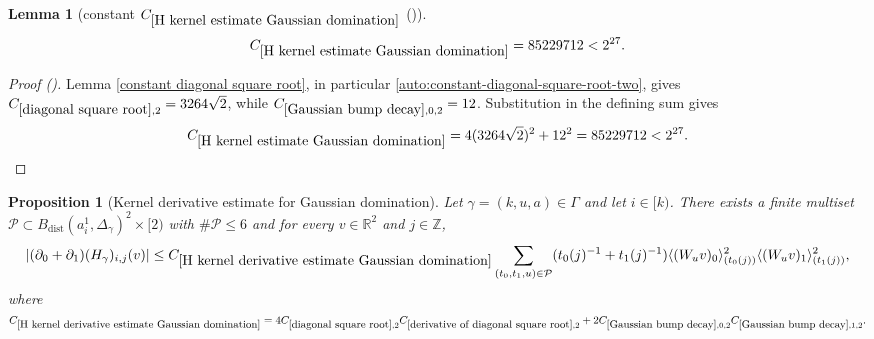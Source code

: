 \documentclass[12pt,reqno]{amsart}
\newcommand{\auto}{{({\tiny\faCar})}}
\theoremstyle{plain}
\newtheorem{lemma}[theorem]{Lemma}
\newtheorem{proposition}[theorem]{Proposition}
\numberwithin{equation}{section}
\theoremstyle{remark}
\newcommand{\uses}[1]{}
\newcommand{\usesdefs}[1]{}
\newcommand{\Z}{{\mathbb Z}}
\newcommand{\R}{{\mathbb R}}
\begin{document}
\begin{lemma}[constant $C_{\ref{H kernel estimate Gaussian domination}}$ \auto]\label{constant H kernel estimate Gaussian domination}\uses{constant diagonal square root,diagonal square root,Gaussian bump decay,H kernel estimate Gaussian domination}\usesdefs{}
\begin{equation}\label{constant H kernel estimate Gaussian domination bound}
C_{\ref{H kernel estimate Gaussian domination}}
=85229712<2^{27}.
\end{equation}
\end{lemma}
\begin{proof}[Proof \auto]
Lemma \ref{constant diagonal square root}, in particular \eqref{auto:constant-diagonal-square-root-two}, gives
$C_{\ref{diagonal square root},2}=3264\sqrt2$, while
$C_{\ref{Gaussian bump decay},0,2}=12$. Substitution in the defining sum gives
\[
C_{\ref{H kernel estimate Gaussian domination}}
=4(3264\sqrt2)^2+12^2
=85229712<2^{27}.
\]
\end{proof}


\begin{proposition}[Kernel derivative estimate for Gaussian domination]\label{H kernel derivative estimate Gaussian domination}\uses{H kernel estimate Gaussian domination,diagonal square root,derivative of diagonal square root,Gaussian bump decay}\usesdefs{bracket bump,closed balls in A,geometric parameters,auto:unitary-matrices-definition,2D Gaussians,auto:Gaussian-difference-kernel-definition,s multiplier,H multiplier}
Let $\gamma=(k,u,a)\in \Gamma$ and let $i\in [k)$.
There exists a finite multiset $\mathcal{P}\subset B_{\mathrm{dist}}(a_i^1,\Delta_\gamma)^2\times [2)$ with $\#\mathcal{P}\le 6$ and for every $v\in \R^2$ and $j\in\Z$,
    \begin{equation}\label{auto:H-kernel-derivative-Gaussian-domination}|(\partial_0+\partial_1)(H_\gamma)_{i,j}(v)| \le C_{\ref{H kernel derivative estimate Gaussian domination}} \sum_{(t_0,t_1,u)\in\mathcal{P}} (t_0(j)^{-1} + t_1(j)^{-1}) \langle (W_u v)_0\rangle_{(t_0(j))}^2 \langle (W_u v)_1\rangle_{(t_1(j))}^2, \end{equation}
where $
C_{\ref{H kernel derivative estimate Gaussian domination}}
=
4C_{\ref{diagonal square root},2}
C_{\ref{derivative of diagonal square root},2}
+
2C_{\ref{Gaussian bump decay},0,2}
C_{\ref{Gaussian bump decay},1,2}.
$
\end{proposition}
\end{document}
